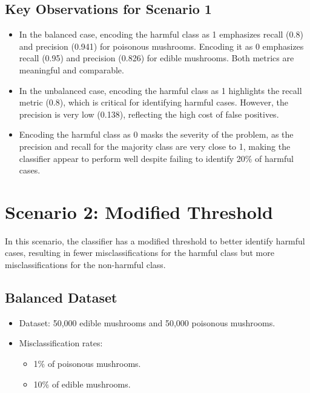 \begin{notechapter}
\subsection{Key Observations for Scenario 1}
\begin{itemize}
    \item In the balanced case, encoding the harmful class as 1 
    emphasizes recall (0.8) and precision (0.941) for poisonous 
    mushrooms. Encoding it as 0 emphasizes recall (0.95) and 
    precision (0.826) for edible mushrooms. Both metrics are 
    meaningful and comparable.
    \item In the unbalanced case, encoding the harmful class as 1 
    highlights the recall metric (0.8), which is critical for 
    identifying harmful cases. However, the precision is very low 
    (0.138), reflecting the high cost of false positives.
    \item Encoding the harmful class as 0 masks the severity of 
    the problem, as the precision and recall for the majority class 
    are very close to 1, making the classifier appear to perform 
    well despite failing to identify 20\% of harmful cases.
\end{itemize}

\section{Scenario 2: Modified Threshold}
In this scenario, the classifier has a modified threshold to 
better identify harmful cases, resulting in fewer misclassifications 
for the harmful class but more misclassifications for the non-harmful 
class.

\subsection{Balanced Dataset}
\begin{itemize}
    \item Dataset: 50,000 edible mushrooms and 50,000 poisonous 
    mushrooms.
    \item Misclassification rates:
        \begin{itemize}
            \item 1\% of poisonous mushrooms.
            \item 10\% of edible mushrooms.
        \end{itemize}
\end{itemize}


\end{notechapter}
